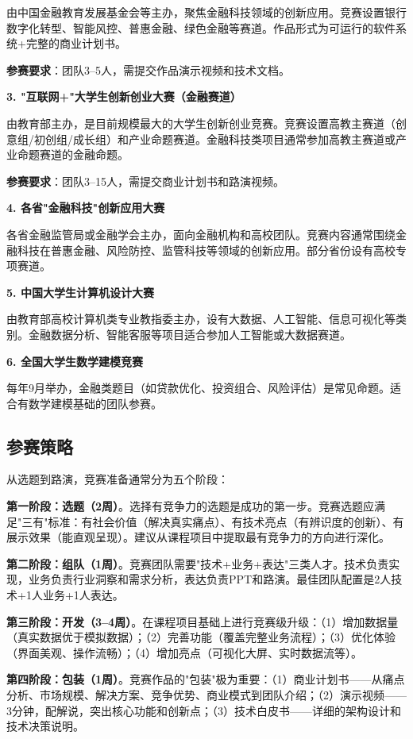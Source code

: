 由中国金融教育发展基金会等主办，聚焦金融科技领域的创新应用。竞赛设置银行数字化转型、智能风控、普惠金融、绿色金融等赛道。作品形式为可运行的软件系统+完整的商业计划书。

\textbf{参赛要求}：团队3--5人，需提交作品演示视频和技术文档。

\textbf{3. "互联网+"大学生创新创业大赛（金融赛道）}

由教育部主办，是目前规模最大的大学生创新创业竞赛。竞赛设置高教主赛道（创意组/初创组/成长组）和产业命题赛道。金融科技类项目通常参加高教主赛道或产业命题赛道的金融命题。

\textbf{参赛要求}：团队3--15人，需提交商业计划书和路演视频。

\textbf{4. 各省"金融科技"创新应用大赛}

各省金融监管局或金融学会主办，面向金融机构和高校团队。竞赛内容通常围绕金融科技在普惠金融、风险防控、监管科技等领域的创新应用。部分省份设有高校专项赛道。

\textbf{5. 中国大学生计算机设计大赛}

由教育部高校计算机类专业教指委主办，设有大数据、人工智能、信息可视化等类别。金融数据分析、智能客服等项目适合参加人工智能或大数据赛道。

\textbf{6. 全国大学生数学建模竞赛}

每年9月举办，金融类题目（如贷款优化、投资组合、风险评估）是常见命题。适合有数学建模基础的团队参赛。

\subsection{参赛策略}

从选题到路演，竞赛准备通常分为五个阶段：

\textbf{第一阶段：选题（2周）}。选择有竞争力的选题是成功的第一步。竞赛选题应满足"三有"标准：有社会价值（解决真实痛点）、有技术亮点（有辨识度的创新）、有展示效果（能直观呈现）。建议从课程项目中提取最有竞争力的方向进行深化。

\textbf{第二阶段：组队（1周）}。竞赛团队需要"技术+业务+表达"三类人才。技术负责实现，业务负责行业洞察和需求分析，表达负责PPT和路演。最佳团队配置是2人技术+1人业务+1人表达。

\textbf{第三阶段：开发（3--4周）}。在课程项目基础上进行竞赛级升级：（1）增加数据量（真实数据优于模拟数据）；（2）完善功能（覆盖完整业务流程）；（3）优化体验（界面美观、操作流畅）；（4）增加亮点（可视化大屏、实时数据流等）。

\textbf{第四阶段：包装（1周）}。竞赛作品的"包装"极为重要：（1）商业计划书——从痛点分析、市场规模、解决方案、竞争优势、商业模式到团队介绍；（2）演示视频——3分钟，配解说，突出核心功能和创新点；（3）技术白皮书——详细的架构设计和技术决策说明。

